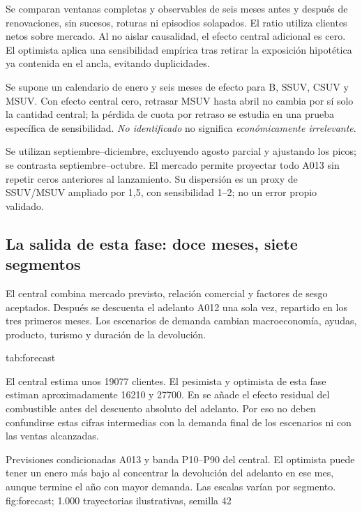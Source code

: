 Se comparan ventanas completas y observables de seis meses antes y después de
renovaciones, sin sucesos, roturas ni episodios solapados. El ratio utiliza clientes
netos sobre mercado. Al no aislar causalidad, el efecto central adicional es cero.
El optimista aplica una sensibilidad empírica tras retirar la exposición hipotética
ya contenida en el ancla, evitando duplicidades.

Se supone un calendario de enero y seis meses de efecto para B, SSUV, CSUV y
MSUV. Con efecto central cero, retrasar MSUV hasta abril no cambia por sí solo
la cantidad central; la pérdida de cuota por retraso se estudia en una prueba
específica de sensibilidad. \emph{No identificado} no significa
\emph{económicamente irrelevante}.

Se utilizan septiembre--diciembre, excluyendo agosto parcial y ajustando los picos;
se contrasta septiembre--octubre. El mercado permite proyectar todo A013 sin
repetir ceros anteriores al lanzamiento. Su dispersión es un proxy de SSUV/MSUV
ampliado por 1,5, con sensibilidad 1--2; no un error propio validado.

\subsection{La salida de esta fase: doce meses, siete segmentos}
El central combina mercado previsto, relación comercial y factores de sesgo
aceptados. Después se descuenta el adelanto A012 una sola vez, repartido en los
tres primeros meses. Los escenarios de demanda cambian macroeconomía, ayudas,
producto, turismo y duración de la devolución.

{tab:forecast}{}

El central estima unos \num{19077} clientes. El pesimista y optimista de esta
fase estiman aproximadamente \num{16210} y \num{27700}. En
 se añade el efecto residual del combustible antes
del descuento absoluto del adelanto. Por eso no deben confundirse estas cifras
intermedias con la demanda final de los escenarios ni con las ventas alcanzadas.

\FloatBarrier
{}
{Previsiones condicionadas A013 y banda P10--P90 del central. El optimista puede
tener un enero más bajo al concentrar la devolución del adelanto en ese mes,
aunque termine el año con mayor demanda. Las escalas varían por segmento.}
{fig:forecast}{; 1.000 trayectorias ilustrativas, semilla 42}
